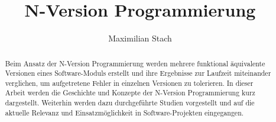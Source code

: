 \title{N-Version Programmierung}



\author{Maximilian Stach}
%




\maketitle


\begin{abstract}
Beim Ansatz der N-Version Programmierung werden mehrere funktional äquivalente Versionen eines Software-Moduls erstellt und ihre Ergebnisse zur Laufzeit miteinander verglichen, um aufgetretene Fehler in einzelnen Versionen zu tolerieren.
In dieser Arbeit werden die Geschichte und Konzepte der N-Version Programmierung kurz dargestellt. Weiterhin werden dazu durchgeführte Studien vorgestellt und auf die aktuelle Relevanz und Einsatzmöglichkeit in Software-Projekten eingegangen.


\end{abstract}
